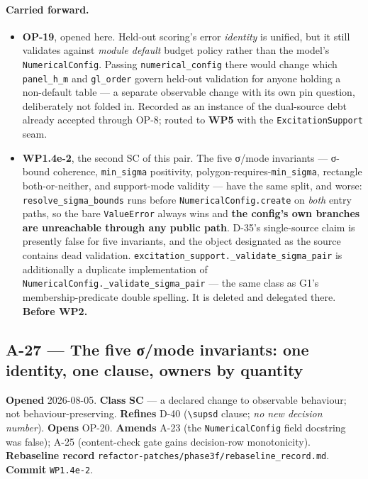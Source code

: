 \documentclass[
  10pt,
]{article}
\providecommand{\tightlist}{%
  \setlength{\itemsep}{0pt}\setlength{\parskip}{0pt}}
\begin{document}
\paragraph{Carried forward.}
\begin{itemize}
\tightlist
\item \textbf{OP-19}, opened here. Held-out scoring's error \emph{identity} is unified, but it still validates against \emph{module default} budget policy rather than the model's \texttt{NumericalConfig}. Passing \texttt{numerical\_config} there would change which \texttt{panel\_h\_m} and \texttt{gl\_order} govern held-out validation for anyone holding a non-default table --- a separate observable change with its own pin question, deliberately not folded in. Recorded as an instance of the dual-source debt already accepted through OP-8; routed to \textbf{WP5} with the \texttt{ExcitationSupport} seam.
\item \textbf{WP1.4e-2}, the second SC of this pair. The five σ/mode invariants --- σ-bound coherence, \texttt{min\_sigma} positivity, polygon-requires-\texttt{min\_sigma}, rectangle both-or-neither, and support-mode validity --- have the same split, and worse: \texttt{resolve\_sigma\_bounds} runs before \texttt{NumericalConfig.create} on \emph{both} entry paths, so the bare \texttt{ValueError} always wins and \textbf{the config's own branches are unreachable through any public path}. D-35's single-source claim is presently false for five invariants, and the object designated as the source contains dead validation. \texttt{excitation\_support.\_validate\_sigma\_pair} is additionally a duplicate implementation of \texttt{NumericalConfig.\_validate\_sigma\_pair} --- the same class as G1's membership-predicate double spelling. It is deleted and delegated there. \textbf{Before WP2.}
\end{itemize}

\hypertarget{a-27}{%
\subsection{A-27 --- The five σ/mode invariants: one identity, one clause, owners by quantity}\label{a-27}}

\textbf{Opened} 2026-08-05. \textbf{Class} \textbf{SC} --- a declared change to observable behaviour; not behaviour-preserving. \textbf{Refines} D-40 (\texttt{\textbackslash supsd} clause; \emph{no new decision number}). \textbf{Opens} OP-20. \textbf{Amends} A-23 (the \texttt{NumericalConfig} field docstring was false); A-25 (content-check gate gains decision-row monotonicity). \textbf{Rebaseline record} \texttt{refactor-patches/phase3f/rebaseline\_record.md}. \textbf{Commit} \texttt{WP1.4e-2}.
\end{document}
